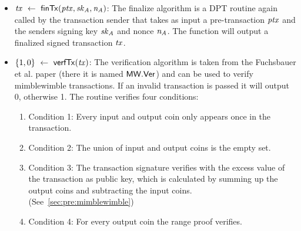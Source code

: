 \begin{definition}
\begin{itemize}
        \item $\mathit{tx} ~\leftarrow~ \mathsf{finTx}(\mathit{ptx},\mathit{sk}_{\mathit{A}},\mathit{\mathit{n}_{\mathit{A}}})$: The finalize algorithm is a DPT routine again called by the transaction sender that takes as input a pre-transaction $\mathit{ptx}$ and the senders signing key $\mathit{sk}_{\mathit{A}}$ and nonce $\mathit{\mathit{n}_{\mathit{A}}}$.
        The function will output a finalized signed transaction $\mathit{tx}$.
        \item $\{1,0\} ~\leftarrow~ \mathsf{verfTx}(\mathit{tx})$: The verification algorithm is taken from the Fuchsbauer et al. paper \cite{fuchsbauer2019aggregate} (there it is named $\mathsf{MW.Ver}$) and can be used to verify mimblewimble transactions.
        If an invalid transaction is passed it will output 0, otherwise 1.
        The routine verifies four conditions:
        \begin{enumerate}
            \item Condition 1: Every input and output coin only appears once in the transaction.
            \item Condition 2: The union of input and output coins is the empty set.
            \item Condition 3: The transaction signature verifies with the excess value of the transaction as public key, which is calculated by summing up the output coins and subtracting the input coins. (See~\cref{sec:pre:mimblewimble})
            \item Condition 4: For every output coin the range proof verifies.
        \end{enumerate}
    \end{itemize}
\end{definition}

